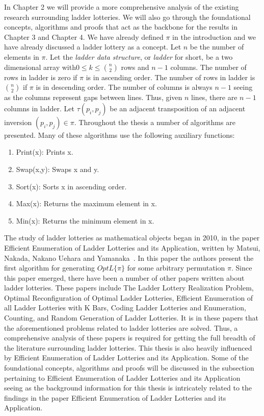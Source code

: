 
In Chapter 2 we will provide a more comprehensive analysis of the existing research surrounding ladder lotteries. 
We will also go through the foundational concepts, algorithms and proofs that act as the backbone for the 
results in Chapter 3 and Chapter 4. We have already defined $\pi$ in the introduction and we have already 
discussed a ladder lottery as a concept. 
Let $n$ be the number of elements in $\pi$. Let the \emph{ladder data structure}, or \emph{ladder} for short, be a two dimensional array 
with$0 \leq k \leq {n\choose 2}$ rows and $n-1$ columns. The number of rows in ladder is zero if $\pi$ is in ascending order.
The number of rows in ladder is ${n\choose 2}$ if $\pi$ is in descending order. The number of columns is always $n-1$ 
seeing as the columns represent gaps between lines. Thus, given $n$ lines, there are $n-1$ columns in ladder. 
Let $\tau(p_{i},p_{j})$ be an adjacent transposition of an adjacent inversion $(p_{i},p_{j})\in \pi$.
Throughout the thesis a number of algorithms are presented. Many of these algorithms use the following auxiliary functions: 
\begin{enumerate}
    \item {\sc Print(x)}: Prints x.
    \item {\sc Swap(x,y)}: Swaps x and y.
    \item {\sc Sort(x)}: Sorts x in ascending order.
    \item {\sc Max(x)}: Returns the maximum element in x.
    \item {\sc Min(x)}: Returns the minimum element in x.
\end{enumerate}

The study of ladder lotteries as mathematical objects began in 2010, in the paper
Efficient Enumeration of Ladder Lotteries and its Application, written by Matsui, Nakada, Nakano Uehara and Yamanaka~\cite{A1}. 
In this paper the authors present the first algorithm for generating $OptL\{\pi\}$ for some  
arbitrary permutation $\pi$. Since this paper emerged, there have been 
a number of other papers written about ladder lotteries.
These papers include The Ladder Lottery Realization Problem,
Optimal Reconfiguration of Optimal Ladder Lotteries, 
Efficient Enumeration of all Ladder Lotteries with K Bars,
Coding Ladder Lotteries and
Enumeration, Counting, and Random Generation of Ladder Lotteries. It is in these papers that the aforementioned 
problems related to ladder lotteries are solved. Thus, a comprehensive analysis of these papers 
is required for getting the full breadth of the literature surrounding ladder lotteries. 
This thesis is also heavily influenced by Efficient Enumeration of Ladder Lotteries and its Application. 
Some of the foundational concepts, algorithms and proofs will be 
discussed in the subsection pertaining to Efficient Enumeration of Ladder Lotteries and its Application seeing as 
the background information for this thesis 
is intricately related to the findings in the paper Efficient Enumeration of Ladder Lotteries and its Application.\par 


